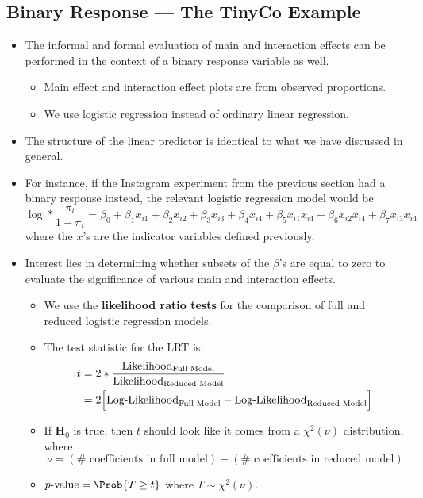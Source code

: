 \subsection{Binary Response --- The TinyCo Example}
\begin{itemize}
      \item The informal and formal evaluation of main and interaction effects can be performed in the context of
            a binary response variable as well.
            \begin{itemize}
                  \item Main effect and interaction effect plots are from observed proportions.
                  \item We use logistic regression instead of ordinary linear regression.
            \end{itemize}
      \item The structure of the linear predictor is identical to what we have discussed in general.
      \item For instance, if the Instagram experiment from the previous section had a binary response instead, the
            relevant logistic regression model would be
            \[ \log*{\frac{\pi_i}{1-\pi_i}}=\beta_0+\beta_1x_{i1}+\beta_2x_{i2}+\beta_3x_{i3}+\beta_4x_{i4}+\beta_5x_{i1}x_{i4}+\beta_6x_{i2}x_{i4}+\beta_7x_{i3}x_{i4} \]
            where the $ x $'s are the indicator variables defined previously.
      \item Interest lies in determining whether subsets of the $ \beta $'s are equal to zero to evaluate the significance of
            various main and interaction effects.
            \begin{itemize}
                  \item We use the \textbf{likelihood ratio tests} for the comparison of full and reduced logistic regression models.
                  \item The test statistic for the LRT is:
                        \begin{align*}
                              t & =2\log*{\frac{\text{Likelihood}_{\text{Full Model}}}{\text{Likelihood}_{\text{Reduced Model}}}}      \\
                                & =2\Bigl[\text{Log-Likelihood}_{\text{Full Model}}-\text{Log-Likelihood}_{\text{Reduced Model}}\Bigr]
                        \end{align*}
                  \item If $ \mathbf{H}_0 $ is true, then $ t $ should look like it comes from a $ \chi^2(\nu) $ distribution, where
                        \[ \nu=(\#\text{ coefficients in full model})-(\#\text{ coefficients in reduced model}) \]
                  \item $ p\text{-value}=\Prob{T\ge t} $ where $ T \sim \chi^2(\nu) $.
            \end{itemize}
\end{itemize}
